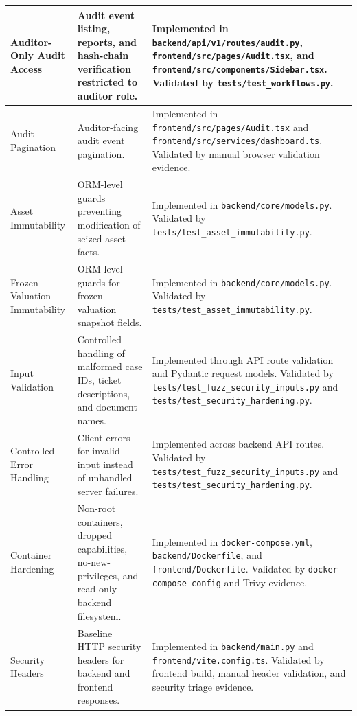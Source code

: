 \documentclass[12pt,a4paper]{report}
\begin{document}
\begin{longtable}{|p{3.0cm}|p{5.0cm}|p{7.0cm}|}
Auditor-Only Audit Access & Audit event listing, reports, and hash-chain verification restricted to auditor role. &
Implemented in \texttt{backend/api/v1/routes/audit.py}, \texttt{frontend/src/pages/Audit.tsx}, and \texttt{frontend/src/components/Sidebar.tsx}. Validated by \texttt{tests/test\_workflows.py}. \\
\hline

Audit Pagination & Auditor-facing audit event pagination. &
Implemented in \texttt{frontend/src/pages/Audit.tsx} and \texttt{frontend/src/services/dashboard.ts}. Validated by manual browser validation evidence. \\
\hline

Asset Immutability & ORM-level guards preventing modification of seized asset facts. &
Implemented in \texttt{backend/core/models.py}. Validated by \texttt{tests/test\_asset\_immutability.py}. \\
\hline

Frozen Valuation Immutability & ORM-level guards for frozen valuation snapshot fields. &
Implemented in \texttt{backend/core/models.py}. Validated by \texttt{tests/test\_asset\_immutability.py}. \\
\hline

Input Validation & Controlled handling of malformed case IDs, ticket descriptions, and document names. &
Implemented through API route validation and Pydantic request models. Validated by \texttt{tests/test\_fuzz\_security\_inputs.py} and \texttt{tests/test\_security\_hardening.py}. \\
\hline

Controlled Error Handling & Client errors for invalid input instead of unhandled server failures. &
Implemented across backend API routes. Validated by \texttt{tests/test\_fuzz\_security\_inputs.py} and \texttt{tests/test\_security\_hardening.py}. \\
\hline

Container Hardening & Non-root containers, dropped capabilities, no-new-privileges, and read-only backend filesystem. &
Implemented in \texttt{docker-compose.yml}, \texttt{backend/Dockerfile}, and \texttt{frontend/Dockerfile}. Validated by \texttt{docker compose config} and Trivy evidence. \\
\hline

Security Headers & Baseline HTTP security headers for backend and frontend responses. &
Implemented in \texttt{backend/main.py} and \texttt{frontend/vite.config.ts}. Validated by frontend build, manual header validation, and security triage evidence. \\
\hline


\end{longtable}
\end{document}
